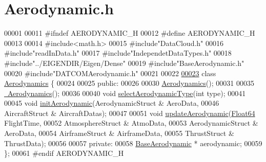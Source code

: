 \hypertarget{_aerodynamic_8h_source}{}\section{Aerodynamic.\+h}
\label{_aerodynamic_8h_source}

\begin{DoxyCode}
00001 
00011 \textcolor{preprocessor}{#ifndef AERODYNAMIC\_H}
00012 \textcolor{preprocessor}{#define AERODYNAMIC\_H}
00013 
00014 \textcolor{preprocessor}{#include<math.h>}
00015 \textcolor{preprocessor}{#include"DataCloud.h"}
00016 \textcolor{preprocessor}{#include"readInData.h"}
00017 \textcolor{preprocessor}{#include"IndependetDataTypes.h"}
00018 \textcolor{preprocessor}{#include"../EIGENDIR/Eigen/Dense"}
00019 \textcolor{preprocessor}{#include"BaseAerodynamic.h"}
00020 \textcolor{preprocessor}{#include"DATCOMAerodynamic.h"}
00021 
00022 
\hyperlink{group___aerodynamic}{00023} \textcolor{keyword}{class }\hyperlink{group___aerodynamic_class_aerodynamics}{Aerodynamics} \{
00024 
00025 \textcolor{keyword}{public}:
00026 
00030     \hyperlink{group___aerodynamic_a36c7ae850ce18605cdbf3ce1709d8e54}{Aerodynamics}();
00031 
00035     \hyperlink{group___aerodynamic_af0e048e0c80ec8334997b79b761fea60}{~Aerodynamics}();
00036 
00040     \textcolor{keywordtype}{void} \hyperlink{group___aerodynamic_a9aa3397e8b1d91ed237146a57bbe6bcf}{selectAerodynamicType}(\textcolor{keywordtype}{int} type);
00041 
00045     \textcolor{keywordtype}{void} \hyperlink{group___aerodynamic_aa4fee96e5b485cac47b3bc2127a6d4e2}{initAerodynamic}(AerodynamicStruct & AeroData, 
00046                          AircraftStruct & AircraftDatas);
00047 
00051     \textcolor{keywordtype}{void} \hyperlink{group___aerodynamic_adf6047b063022ff3b689e269d2b35863}{updateAerodynamic}(\hyperlink{group___tools_ga3f1431cb9f76da10f59246d1d743dc2c}{Float64} FlightTime,
00052                             AtmosphereStruct & AtmoData,
00053                             AerodynamicStruct & AeroData,
00054                             AirframeStruct & AirframeData,
00055                             ThrustStruct & ThrustData);
00056 
00057 \textcolor{keyword}{private}:
00058     \hyperlink{group___aerodynamic_class_base_aerodynamic}{BaseAerodynamic} * aerodynamic;
00059 \};
00061 \textcolor{preprocessor}{#endif  AERODYNAMIC\_H}
\end{DoxyCode}
